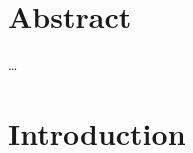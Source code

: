 \documentclass[11pt]{article}
\begin{document}





\newpage{}
\section*{Abstract}
\ldots 

\newpage{}

\section*{Introduction}
\end{document}

